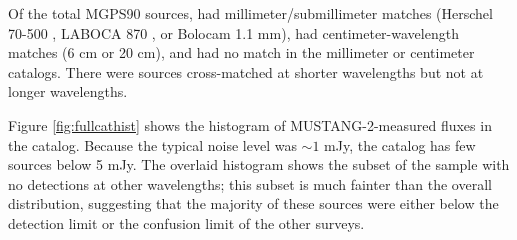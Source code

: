 \documentclass[twocolumn]{aastex62}
\def\todo#1{{\textcolor{red}{TODO: #1}}}
\newcommand{\MGPS}{MGPS90\xspace}
\newcommand{\MUSTANG}{MUSTANG-2\xspace}
\begin{document}

Of the \nsources total \MGPS sources, \mmdetections had millimeter/submillimeter
matches (Herschel 70-500 \um, LABOCA 870 \um, or Bolocam 1.1 mm), \cmdetections 
had centimeter-wavelength matches (6 cm or 20 cm), and \cmmmnondetections
had no match in the millimeter or centimeter catalogs.  
There were \mmdetectionscmnondetections sources cross-matched at shorter
wavelengths but not at longer wavelengths.  


Figure \ref{fig:fullcathist} shows the histogram of \MUSTANG-measured fluxes
in the catalog.  Because the typical noise level was $\sim1$ mJy, the catalog
has few sources below 5 mJy.  The overlaid histogram shows the subset of
the sample with no detections at other wavelengths; this subset is much
fainter than the overall distribution, suggesting that the majority
of these sources were either below the detection limit or the confusion
limit of the other surveys.  
\end{document}
